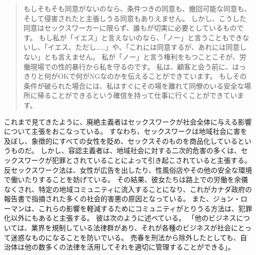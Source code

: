 \documentclass[paper=a4,book,openany]{jlreq}
\newcommand{\ig}[1]{}           %
\begin{document}
\begin{quote}
もしそもそも同意がないのなら、条件つきの同意も、撤回可能な同意も、そして侵害されたと主張しうる同意もありえません。
しかし、こうした同意はセックスワーカーに限らず、誰もが切実に必要としているものです。
もし私が「イエス」と言えないのなら、「ノー」と言うこともできないし、「イエス、ただし……」や、「これには同意するが、あれには同意しない」とも言えません。
私が「ノー」と言う権利をもつことこそが、労働現場での性的暴行から私を守るのです。
私は、顧客と会う前に、はっきりと何がOKで何がNGなのかを伝えることができています。
もしその条件が破られた場合には、私はすぐにその場を離れて同僚のいる安全な場所に帰ることができるという確信を持って仕事に行くことができています。
\citep{slyfox17:_sex_worker_consen}
\end{quote}

これまで見てきたように、廃絶主義者はセックスワークが社会全体に与える影響について主張をおこなっている。
すなわち、セックスワークは地域社会に害を及ぼし、象徴的にすべての女性を貶め、セックスそのものを商品化しているというものだ。
しかし、容認主義者は、地域社会に対する二次的危害の多くは、セックスワークが犯罪とされていることによって引き起こされていると主張する。
反セックスワーク法は、女性が広告を出したり、性風俗店やその他の安全な環境で働いたりすることを妨げている。
その結果、彼女たちは路上での労働を余儀なくされ、特定の地域コミュニティに流入することになり、これがカナダ政府の報告書で指摘された多くの社会的害悪の原因となっている。
また、ジョン・ローマン\ig{John Lowman}は、これらの影響を軽減するためにコミュニティがとりうる方法は、犯罪化以外にもあると主張する。
彼は次のように述べている。
「他のビジネスについては、業界を規制している法律群があり、それが各種のビジネスが社会にとって迷惑なものになることを防いでいる。
売春を刑法から除外したとしても、自治体は他の数多くの法律を活用してそれを適切に管理することができる」\citep{makin09:_pickt_factor}。
\end{document}
